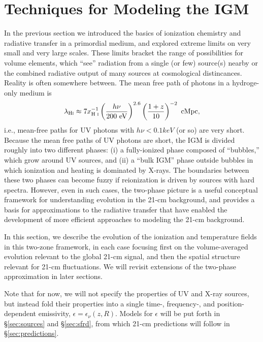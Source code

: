 \section{Techniques for Modeling the IGM} \label{sec:techniques}
In the previous section we introduced the basics of ionization chemistry and radiative transfer in a primordial medium, and explored extreme limits on very small and very large scales. These limits bracket the range of possibilities for volume elements, which ``see'' radiation from a single (or few) source(s) nearby or the combined radiative output of many sources at cosmological distincances. {\color{red} Reality is often somewhere between.} The mean free path of photons in a hydroge-only medium is \cite[e.g.,][]{McQuinn2012}
\begin{equation}
	\lambda_{\text{H} {\textsc{i}}} \approx 7 x_{\text{H } \textsc{i}}^{-1} \left(\frac{h\nu}{200 \ \mathrm{eV}} \right)^{2.6} \left(\frac{1+z}{10} \right)^{-2} \ \mathrm{cMpc} ,
\end{equation}
i.e., mean-free paths for UV photons with $h\nu < 0.1 keV$ (or so) are very short. Because the mean free paths of UV photons are short, the IGM is divided roughly into two different phases: (i) a fully-ionized phase composed of ``bubbles,'' which grow around UV sources, and (ii) a ``bulk IGM'' phase outside bubbles in which ionization and heating is dominated by X-rays. The boundaries between these two phases can become fuzzy if reionization is driven by sources with hard spectra. However, even in such cases, the two-phase picture is a useful conceptual framework for understanding evolution in the 21-cm background, and provides a basis for approximations to the radiative transfer that have enabled the development of more efficient approaches to modeling the 21-cm background. 

In this section, we describe the evolution of the ionization and temperature fields in this two-zone framework, in each case focusing first on the volume-averaged evolution relevant to the global 21-cm signal, and then the spatial structure relevant for 21-cm fluctuations. We will revisit extensions of the two-phase approximation in later sections.

Note that for now, we will not specify the properties of UV and X-ray sources, but instead fold their properties into a single time-, frequency-, and position-dependent emissivity, $\epsilon = \epsilon_{\nu}(z,R)$. Models for $\epsilon$ will be put forth in \S\ref{sec:sources} and \S\ref{sec:sfrd}, from which 21-cm predictions will follow in \S\ref{sec:predictions}. 

